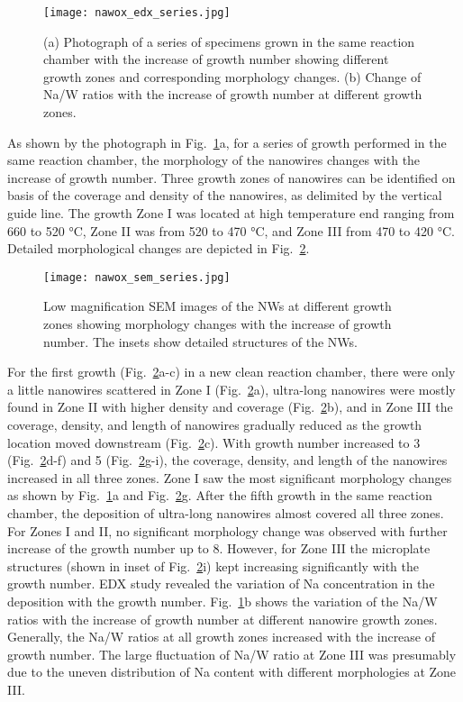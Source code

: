 \begin{figure}[htb]
\centering
\texttt{[image: nawox\_edx\_series.jpg]}
\caption[Photograph of a series of 3N growth]{(a) Photograph of a series of specimens grown in the same reaction chamber with the increase of growth number showing different growth zones and corresponding morphology changes. (b) Change of Na/W ratios with the increase of growth number at different growth zones.}
\label{fig:nawoxser}
\end{figure}

As shown by the photograph in Fig.~\ref{fig:nawoxser}a, for a series of growth performed in the same reaction chamber, the morphology of the nanowires changes with the increase of growth number. Three growth zones of nanowires can be identified on basis of the coverage and density of the nanowires, as delimited by the vertical guide line. The growth Zone I was located at high temperature end ranging from 660 to 520 \si{\degreeCelsius}, Zone II was from 520 to 470 \si{\degreeCelsius}, and Zone III from 470 to 420 \si{\degreeCelsius}. Detailed morphological changes are depicted in Fig.~\ref{fig:nawoxsemall}.
\begin{figure}[htb]
\centering
\texttt{[image: nawox\_sem\_series.jpg]}
\caption[SEM images of morphology evolution]{Low magnification SEM images of the NWs at different growth zones showing morphology changes with the increase of growth number. The insets show detailed structures of the NWs.}
\label{fig:nawoxsemall}
\end{figure}
For the first growth (Fig.~\ref{fig:nawoxsemall}a-c) in a new clean reaction chamber, there were only a little nanowires scattered in Zone I (Fig.~\ref{fig:nawoxsemall}a), ultra-long nanowires were mostly found in Zone II with higher density and coverage (Fig.~\ref{fig:nawoxsemall}b), and in Zone III the coverage, density, and length of nanowires gradually reduced as the growth location moved downstream (Fig.~\ref{fig:nawoxsemall}c). With growth number increased to 3 (Fig.~\ref{fig:nawoxsemall}d-f) and 5 (Fig.~\ref{fig:nawoxsemall}g-i), the coverage, density, and length of the nanowires increased in all three zones. Zone I saw the most significant morphology changes as shown by Fig.~\ref{fig:nawoxser}a and Fig.~\ref{fig:nawoxsemall}g. After the fifth growth in the same reaction chamber, the deposition of ultra-long nanowires almost covered all three zones. For Zones I and II, no significant morphology change was observed with further increase of the growth number up to 8. However, for Zone III the microplate structures (shown in inset of Fig.~\ref{fig:nawoxsemall}i) kept increasing significantly with the growth number. EDX study revealed the variation of Na concentration in the deposition with the growth number. Fig.~\ref{fig:nawoxser}b shows the variation of the Na/W ratios with the increase of growth number at different nanowire growth zones. Generally, the Na/W ratios at all growth zones increased with the increase of growth number. The large fluctuation of Na/W ratio at Zone III was presumably due to the uneven distribution of Na content with different morphologies at Zone III.

